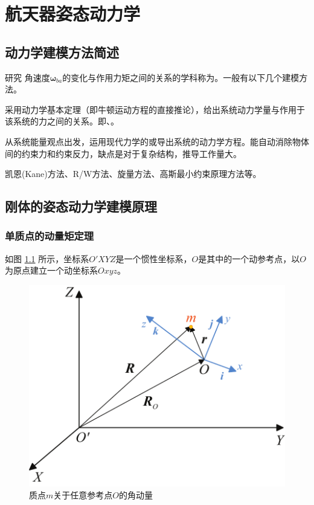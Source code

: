 \chapter{航天器姿态动力学}
\thispagestyle{empty}
\section{动力学建模方法简述}
研究{\color{dy} 角速度$\bm{\omega}_{ba}$的变化与作用力矩之间的关系}的学科称为。一般有以下几个建模方法。
\vspace*{1em}


采用动力学基本定理（即牛顿运动方程的直接推论），给出系统动力学量与作用于该系统的力之间的关系。即、。
\vspace*{1em}



从系统能量观点出发，运用现代力学的或导出系统的动力学方程。能自动消除物体间的约束力和约束反力，缺点是对于复杂结构，推导工作量大。
\vspace*{1em}


\sssection[矢量力学与分析力学的各种变形方法]

凯恩(Kane)方法、R/W方法、旋量方法、高斯最小约束原理方法等。




\section{刚体的姿态动力学建模原理}
\subsection{单质点的动量矩定理}
\sssection[质点的角动量及其导数]

如图 \ref{单质点角动量} 所示，坐标系$O'XYZ$是一个惯性坐标系，$O$是其中的一个动参考点，以$O$为原点建立一个动坐标系$Oxyz$。

\begin{figure}[!htb]
	\centering
	\includegraphics[width=0.4\linewidth]{pic/单质点角动量}
	\vspace*{-1em}
	\caption{质点$m$关于任意参考点$O$的角动量}
	\label{单质点角动量}
\end{figure}

